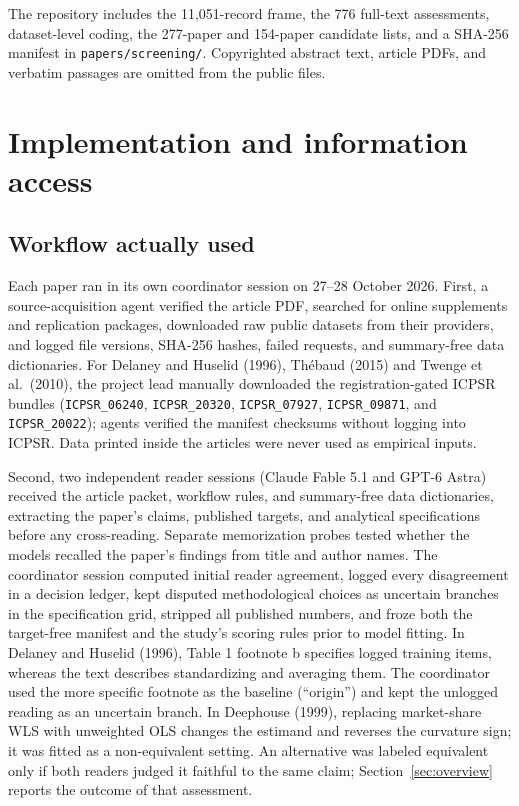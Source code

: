 \documentclass[11pt]{article}
\newcommand{\artifact}[1]{\nolinkurl{#1}}
\begin{document}
The repository includes the 11,051-record frame, the 776 full-text assessments, dataset-level coding, the 277-paper and 154-paper candidate lists, and a SHA-256 manifest in \artifact{papers/screening/}. Copyrighted abstract text, article PDFs, and verbatim passages are omitted from the public files.

\clearpage
\section{Implementation and information access}\label{sec:implementation}\label{app:protocol}
\subsection{Workflow actually used}
Each paper ran in its own coordinator session on 27--28 October 2026. First, a source-acquisition agent verified the article PDF, searched for online supplements and replication packages, downloaded raw public datasets from their providers, and logged file versions, SHA-256 hashes, failed requests, and summary-free data dictionaries. For Delaney and Huselid (1996), Th\'ebaud (2015) and Twenge et al.\ (2010), the project lead manually downloaded the registration-gated ICPSR bundles (\texttt{ICPSR\_06240}, \texttt{ICPSR\_20320}, \texttt{ICPSR\_07927}, \texttt{ICPSR\_09871}, and \texttt{ICPSR\_20022}); agents verified the manifest checksums without logging into ICPSR. Data printed inside the articles were never used as empirical inputs.

Second, two independent reader sessions (Claude Fable 5.1 and GPT-6 Astra) received the article packet, workflow rules, and summary-free data dictionaries, extracting the paper's claims, published targets, and analytical specifications before any cross-reading. Separate memorization probes tested whether the models recalled the paper's findings from title and author names. The coordinator session computed initial reader agreement, logged every disagreement in a decision ledger, kept disputed methodological choices as uncertain branches in the specification grid, stripped all published numbers, and froze both the target-free manifest and the study's scoring rules prior to model fitting. In Delaney and Huselid (1996), Table 1 footnote b specifies logged training items, whereas the text describes standardizing and averaging them. The coordinator used the more specific footnote as the baseline (``origin'') and kept the unlogged reading as an uncertain branch. In Deephouse (1999), replacing market-share WLS with unweighted OLS changes the estimand and reverses the curvature sign; it was fitted as a non-equivalent setting. An alternative was labeled equivalent only if both readers judged it faithful to the same claim; Section~\ref{sec:overview} reports the outcome of that assessment.
\end{document}
